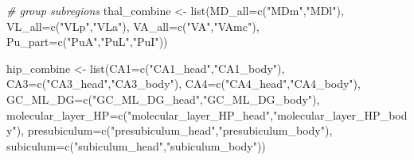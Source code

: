 \documentclass[
]{article}
\newenvironment{Shaded}{\begin{snugshade}}{\end{snugshade}}
\newcommand{\AttributeTok}[1]{\textcolor[rgb]{0.77,0.63,0.00}{#1}}
\newcommand{\CommentTok}[1]{\textcolor[rgb]{0.56,0.35,0.01}{\textit{#1}}}
\newcommand{\FunctionTok}[1]{\textcolor[rgb]{0.00,0.00,0.00}{#1}}
\newcommand{\NormalTok}[1]{#1}
\newcommand{\OtherTok}[1]{\textcolor[rgb]{0.56,0.35,0.01}{#1}}
\newcommand{\StringTok}[1]{\textcolor[rgb]{0.31,0.60,0.02}{#1}}
\begin{document}
\begin{Shaded}
\begin{Highlighting}[]
\CommentTok{\# group subregions}
\NormalTok{thal\_combine }\OtherTok{\textless{}{-}} \FunctionTok{list}\NormalTok{(}\AttributeTok{MD\_all=}\FunctionTok{c}\NormalTok{(}\StringTok{"MDm"}\NormalTok{,}\StringTok{"MDl"}\NormalTok{),}
                     \AttributeTok{VL\_all=}\FunctionTok{c}\NormalTok{(}\StringTok{"VLp"}\NormalTok{,}\StringTok{"VLa"}\NormalTok{),}
                     \AttributeTok{VA\_all=}\FunctionTok{c}\NormalTok{(}\StringTok{"VA"}\NormalTok{,}\StringTok{"VAmc"}\NormalTok{),}
                     \AttributeTok{Pu\_part=}\FunctionTok{c}\NormalTok{(}\StringTok{"PuA"}\NormalTok{,}\StringTok{"PuL"}\NormalTok{,}\StringTok{"PuI"}\NormalTok{))}

\NormalTok{hip\_combine }\OtherTok{\textless{}{-}} \FunctionTok{list}\NormalTok{(}\AttributeTok{CA1=}\FunctionTok{c}\NormalTok{(}\StringTok{"CA1\_head"}\NormalTok{,}\StringTok{"CA1\_body"}\NormalTok{),}
                     \AttributeTok{CA3=}\FunctionTok{c}\NormalTok{(}\StringTok{"CA3\_head"}\NormalTok{,}\StringTok{"CA3\_body"}\NormalTok{),}
                     \AttributeTok{CA4=}\FunctionTok{c}\NormalTok{(}\StringTok{"CA4\_head"}\NormalTok{,}\StringTok{"CA4\_body"}\NormalTok{),}
                     \AttributeTok{GC\_ML\_DG=}\FunctionTok{c}\NormalTok{(}\StringTok{"GC\_ML\_DG\_head"}\NormalTok{,}\StringTok{"GC\_ML\_DG\_body"}\NormalTok{),}
                     \AttributeTok{molecular\_layer\_HP=}\FunctionTok{c}\NormalTok{(}\StringTok{"molecular\_layer\_HP\_head"}\NormalTok{,}\StringTok{"molecular\_layer\_HP\_body"}\NormalTok{),}
                     \AttributeTok{presubiculum=}\FunctionTok{c}\NormalTok{(}\StringTok{"presubiculum\_head"}\NormalTok{,}\StringTok{"presubiculum\_body"}\NormalTok{),}
                     \AttributeTok{subiculum=}\FunctionTok{c}\NormalTok{(}\StringTok{"subiculum\_head"}\NormalTok{,}\StringTok{"subiculum\_body"}\NormalTok{))}


\end{Highlighting}
\end{Shaded}
\end{document}
